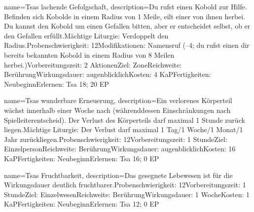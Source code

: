 {
    name={Tsas lachende Gefolgschaft},
    description={Du rufst einen Kobold zur Hilfe. Befinden sich Kobolde in einem Radius von 1 Meile, eilt einer von ihnen herbei. Du kannst den Kobold um einen Gefallen bitten, aber er entscheidet selbst, ob er den Gefallen erfüllt.\newline Mächtige Liturgie: Verdoppelt den Radius.\newline Probenschwierigkeit: 12\newline Modifikationen: Namensruf (–4; du rufst einen dir bereits bekannten Kobold in einem Radius von 8 Meilen herbei.)\newline Vorbereitungszeit: 2 Aktionen\newline Ziel: Zone\newline Reichweite: Berührung\newline Wirkungsdauer: augenblicklich\newline Kosten: 4 KaP\newline Fertigkeiten: Neubeginn\newline Erlernen: Tsa 18; 20 EP}
}


{
    name={Tsas wunderbare Erneuerung},
    description={Ein verlorenes Körperteil wächst innerhalb einer Woche nach (währenddessen Einschränkungen nach Spielleiterentscheid). Der Verlust des Körperteils darf maximal 1 Stunde zurück liegen.\newline Mächtige Liturgie: Der Verlust darf maximal 1 Tag/1 Woche/1 Monat/1 Jahr zurückliegen.\newline Probenschwierigkeit: 12\newline Vorbereitungszeit: 1 Stunde\newline Ziel: Einzelperson\newline Reichweite: Berührung\newline Wirkungsdauer: augenblicklich\newline Kosten: 16 KaP\newline Fertigkeiten: Neubeginn\newline Erlernen: Tsa 16; 0 EP}
}


{
    name={Tsas Fruchtbarkeit},
    description={Das gesegnete Lebewesen ist für die Wirkungsdauer deutlich fruchtbarer.\newline Probenschwierigkeit: 12\newline Vorbereitungszeit: 1 Stunde\newline Ziel: Einzelwesen\newline Reichweite: Berührung\newline Wirkungsdauer: 1 Woche\newline Kosten: 1 KaP\newline Fertigkeiten: Neubeginn\newline Erlernen: Tsa 12; 0 EP}
}


